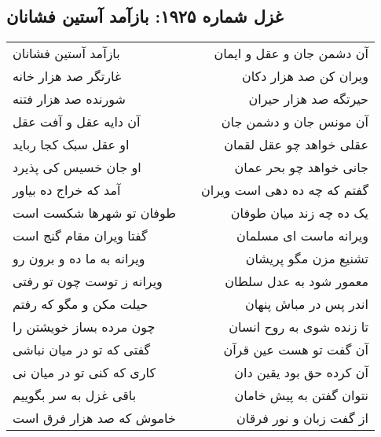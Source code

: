 \begin{center}
\section*{غزل شماره ۱۹۲۵: بازآمد آستین فشانان}
\label{sec:1925}
\begin{longtable}{l p{0.5cm} r}
بازآمد آستین فشانان
&&
آن دشمن جان و عقل و ایمان
\\
غارتگر صد هزار خانه
&&
ویران کن صد هزار دکان
\\
شورنده صد هزار فتنه
&&
حیرتگه صد هزار حیران
\\
آن دایه عقل و آفت عقل
&&
آن مونس جان و دشمن جان
\\
او عقل سبک کجا رباید
&&
عقلی خواهد چو عقل لقمان
\\
او جان خسیس کی پذیرد
&&
جانی خواهد چو بحر عمان
\\
آمد که خراج ده بیاور
&&
گفتم که چه ده دهی است ویران
\\
طوفان تو شهرها شکست است
&&
یک ده چه زند میان طوفان
\\
گفتا ویران مقام گنج است
&&
ویرانه ماست ای مسلمان
\\
ویرانه به ما ده و برون رو
&&
تشنیع مزن مگو پریشان
\\
ویرانه ز توست چون تو رفتی
&&
معمور شود به عدل سلطان
\\
حیلت مکن و مگو که رفتم
&&
اندر پس در مباش پنهان
\\
چون مرده بساز خویشتن را
&&
تا زنده شوی به روح انسان
\\
گفتی که تو در میان نباشی
&&
آن گفت تو هست عین قرآن
\\
کاری که کنی تو در میان نی
&&
آن کرده حق بود یقین دان
\\
باقی غزل به سر بگوییم
&&
نتوان گفتن به پیش خامان
\\
خاموش که صد هزار فرق است
&&
از گفت زبان و نور فرقان
\\
\end{longtable}
\end{center}
